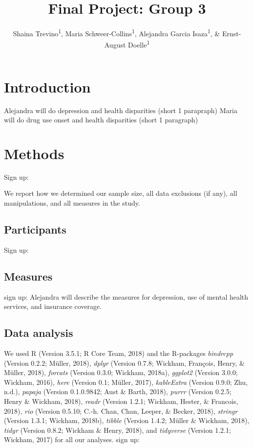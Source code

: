 \documentclass[man]{apa6}
\title{Final Project: Group 3}
\author{Shaina Trevino\textsuperscript{1}, Maria
Schweer-Collins\textsuperscript{1}, Alejandra Garcia
Isaza\textsuperscript{1}, \& Ernst-August Doelle\textsuperscript{1}}
\date{}
\affiliation{
\vspace{0.5cm}
\textsuperscript{1} University of Oregon}
\begin{document}
\maketitle

\section{Introduction}\label{introduction}

Alejandra will do depression and health disparities (short 1 parapraph)
Maria will do drug use onset and health disparities (short 1 paragraph)

\section{Methods}\label{methods}

Sign up:

We report how we determined our sample size, all data exclusions (if
any), all manipulations, and all measures in the study.

\subsection{Participants}\label{participants}

Sign up:

\subsection{Measures}\label{measures}

sign up: Alejandra will describe the measures for depression, use of
mental health services, and insurance coverage.

\subsection{Data analysis}\label{data-analysis}

We used R (Version 3.5.1; R Core Team, 2018) and the R-packages
\emph{bindrcpp} (Version 0.2.2; Müller, 2018), \emph{dplyr} (Version
0.7.8; Wickham, François, Henry, \& Müller, 2018), \emph{forcats}
(Version 0.3.0; Wickham, 2018a), \emph{ggplot2} (Version 3.0.0; Wickham,
2016), \emph{here} (Version 0.1; Müller, 2017), \emph{kableExtra}
(Version 0.9.0; Zhu, n.d.), \emph{papaja} (Version 0.1.0.9842; Aust \&
Barth, 2018), \emph{purrr} (Version 0.2.5; Henry \& Wickham, 2018),
\emph{readr} (Version 1.2.1; Wickham, Hester, \& Francois, 2018),
\emph{rio} (Version 0.5.10; C.-h. Chan, Chan, Leeper, \& Becker, 2018),
\emph{stringr} (Version 1.3.1; Wickham, 2018b), \emph{tibble} (Version
1.4.2; Müller \& Wickham, 2018), \emph{tidyr} (Version 0.8.2; Wickham \&
Henry, 2018), and \emph{tidyverse} (Version 1.2.1; Wickham, 2017) for
all our analyses. sign up:
\end{document}
